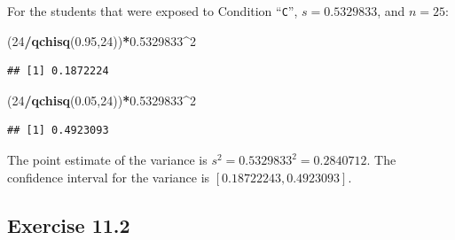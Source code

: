 \documentclass[
]{krantz}
\makeatletter
\newenvironment{Shaded}{\begin{snugshade}}{\end{snugshade}}
\newcommand{\DecValTok}[1]{\textcolor[rgb]{0.00,0.00,0.81}{#1}}
\newcommand{\FloatTok}[1]{\textcolor[rgb]{0.00,0.00,0.81}{#1}}
\newcommand{\KeywordTok}[1]{\textcolor[rgb]{0.13,0.29,0.53}{\textbf{#1}}}
\newcommand{\NormalTok}[1]{#1}
\newcommand{\OperatorTok}[1]{\textcolor[rgb]{0.81,0.36,0.00}{\textbf{#1}}}
\newenvironment{kframe}{%
\medskip{}
\setlength{\fboxsep}{.8em}
 \def\at@end@of@kframe{}%
 \ifinner\ifhmode%
  \def\at@end@of@kframe{\end{minipage}}%
  \begin{minipage}{\columnwidth}%
 \fi\fi%
 \def\FrameCommand##1{\hskip\@totalleftmargin \hskip-\fboxsep
 \colorbox{shadecolor}{##1}\hskip-\fboxsep
     \hskip-\linewidth \hskip-\@totalleftmargin \hskip\columnwidth}%
 \MakeFramed {\advance\hsize-\width
   \@totalleftmargin\z@ \linewidth\hsize
   \@setminipage}}%
 {\par\unskip\endMakeFramed%
 \at@end@of@kframe}
\renewenvironment{Shaded}{\begin{kframe}}{\end{kframe}}
\theoremstyle{definition}
\theoremstyle{definition}
\theoremstyle{definition}
\theoremstyle{remark}
\makeatother
\begin{document}
\begin{enumerate}
  For the students that were exposed to Condition ``\texttt{C}'', \(s = 0.5329833\),
  and \(n = 25\):

\begin{Shaded}
\begin{Highlighting}[]
\NormalTok{(}\DecValTok{24}\OperatorTok{/}\KeywordTok{qchisq}\NormalTok{(}\FloatTok{0.95}\NormalTok{,}\DecValTok{24}\NormalTok{))}\OperatorTok{*}\FloatTok{0.5329833}\OperatorTok{^}\DecValTok{2}
\end{Highlighting}
\end{Shaded}

\begin{verbatim}
## [1] 0.1872224
\end{verbatim}

\begin{Shaded}
\begin{Highlighting}[]
\NormalTok{(}\DecValTok{24}\OperatorTok{/}\KeywordTok{qchisq}\NormalTok{(}\FloatTok{0.05}\NormalTok{,}\DecValTok{24}\NormalTok{))}\OperatorTok{*}\FloatTok{0.5329833}\OperatorTok{^}\DecValTok{2}
\end{Highlighting}
\end{Shaded}

\begin{verbatim}
## [1] 0.4923093
\end{verbatim}

  The point estimate of the variance is \(s^2 = 0.5329833^2 = 0.2840712\).
  The confidence interval for the variance is \([0.18722243, 0.4923093]\).
\end{enumerate}

\hypertarget{exercise-11.2}{%
\subsection*{Exercise 11.2}\label{exercise-11.2}}
\end{document}
